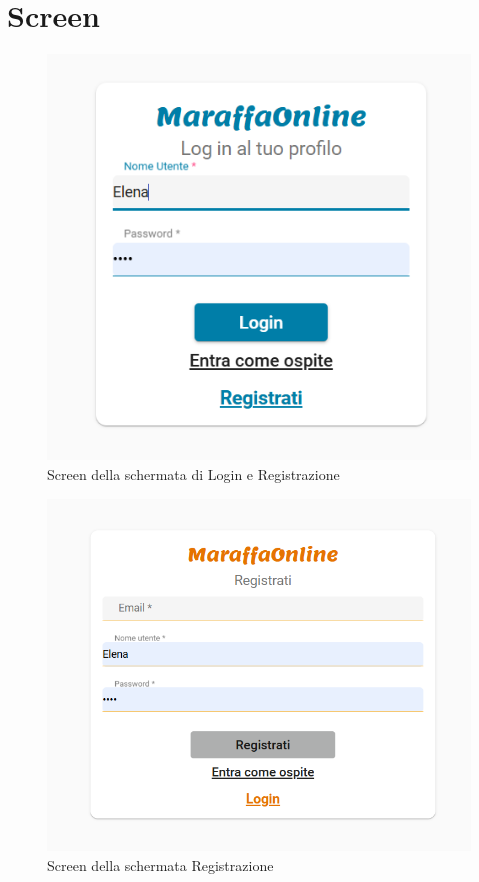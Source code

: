 \section{Screen}
\begin{figure}[h!]
    \centering 
    \includegraphics[scale=0.90]{report/img/login.png}
    \caption{Screen della schermata di Login e Registrazione}
    \label{screen}
\end{figure}
\begin{figure}[h!]
    \centering 
    \includegraphics[scale=0.90]{report/img/register.png}
    \caption{Screen della schermata Registrazione}
    \label{screen}
\end{figure}

